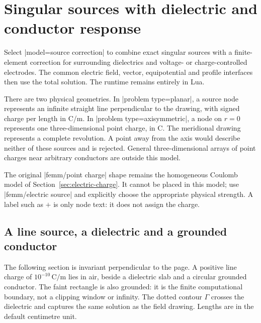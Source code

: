 \section{Singular sources with dielectric and conductor response}
\label{sec:electric-hybrid}

Select |model=source correction| to combine exact singular sources with a
finite-element correction for surrounding dielectrics and voltage- or charge-controlled electrodes.
The common electric field, vector, equipotential and profile interfaces then
use the total solution. The runtime remains entirely in Lua.

There are two physical geometries. In |problem type=planar|, a source node
represents an infinite straight line perpendicular to the drawing, with signed
charge per length in C/m. In |problem type=axisymmetric|, a node on $r=0$
represents one three-dimensional point charge, in C. The meridional drawing
represents a complete revolution. A point away from the axis would describe
neither of these sources and is rejected. General three-dimensional arrays of
point charges near arbitrary conductors are outside this model.

The original |femm/point charge| shape remains the homogeneous Coulomb model
of Section~\ref{sec:electric-charge}. It cannot be placed in this model; use
|femm/electric source| and explicitly choose the appropriate physical strength.
A label such as $+$ is only node text: it does not assign the charge.

\subsection{A line source, a dielectric and a grounded conductor}
The following section is invariant perpendicular to the page. A positive line
charge of $10^{-10}\,\mathrm{C/m}$ lies in air, beside a dielectric slab and a
circular grounded conductor. The faint rectangle is also grounded: it is the
finite computational boundary, not a clipping window or infinity. The dotted
contour $\Gamma$ crosses the dielectric and captures the same solution as the
field drawing. Lengths are in the default centimetre unit.

